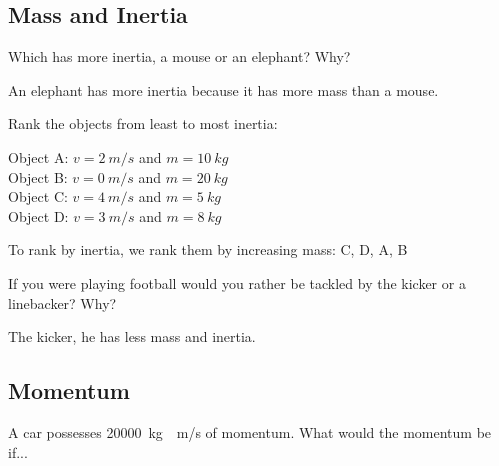 \documentclass[answers]{exam}
\begin{document}
\begin{questions}
\begin{EnvUplevel}
    \subsection{Mass and Inertia}
\end{EnvUplevel}

\question
Which has more inertia, a mouse or an elephant? Why?

\begin{solution}
    An elephant has more inertia because it has more mass than a mouse.
\end{solution}

\question
Rank the objects from least to most inertia:

Object A: $v = \SI{2}{m/s}$ and $m = \SI{10}{kg}$\\
Object B: $v = \SI{0}{m/s}$ and $m = \SI{20}{kg}$\\
Object C: $v = \SI{4}{m/s}$ and $m = \SI{5}{kg}$\\
Object D: $v = \SI{3}{m/s}$ and $m = \SI{8}{kg}$

\begin{solution}
    To rank by inertia, we rank them by increasing mass: C, D, A, B
\end{solution}

\question
If you were playing football would you rather be tackled by the kicker or a linebacker? Why?

\begin{solution}
    The kicker, he has less mass and inertia.
\end{solution}

\clearpage
\begin{EnvUplevel}
    \subsection{Momentum}
\end{EnvUplevel}

\question

A car possesses \SI[group-separator={,}]{20000}{kg\cdot m/s} of momentum. What would the momentum be if...

\end{questions}
\end{document}
